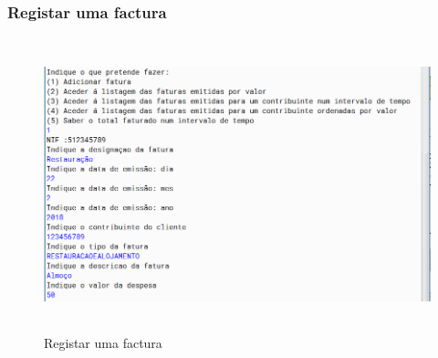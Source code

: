 \documentclass[a4paper]{article}
\begin{document}
		\subsubsection{Registar uma factura}
			\begin{figure}[htbp]
				\centering
				\includegraphics[width = 320pt,height = 240pt]{adicionarfaturaempresa.png}
				\caption{Registar uma factura}
			\end{figure}
\end{document}
